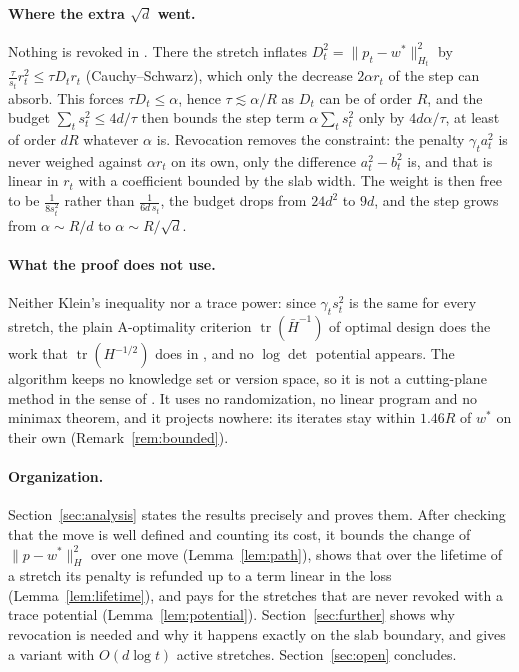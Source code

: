 \documentclass[11pt]{article}
\theoremstyle{plain}
\theoremstyle{definition}
\theoremstyle{remark}
\DeclareMathOperator{\tr}{tr}
\newcommand{\wstar}{w^{\ast}}
\begin{document}
\paragraph{Where the extra $\sqrt d$ went.} Nothing is revoked in \cite{Cai26}. There the stretch
inflates $D_t^{2}=\|p_t-\wstar\|_{H_t}^{2}$ by $\tfrac{\tau}{s_t}r_t^{2}\le\tau D_tr_t$
(Cauchy--Schwarz), which only the decrease $2\alpha r_t$ of the step can absorb. This forces
$\tau D_t\le\alpha$, hence $\tau\lesssim\alpha/R$ as $D_t$ can be of order $R$, and the budget
$\sum_ts_t^{2}\le4d/\tau$ then bounds the step term $\alpha\sum_ts_t^{2}$ only by $4d\alpha/\tau$,
at least of order $dR$ whatever $\alpha$ is. Revocation removes the constraint: the penalty
$\gamma_ta_t^{2}$ is never weighed against $\alpha r_t$ on its own, only the difference
$a_t^{2}-b_t^{2}$ is, and that is linear in $r_t$ with a coefficient bounded by the slab width. The
weight is then free to be $\tfrac{1}{8s_t^{2}}$ rather than $\tfrac{1}{6d\,s_t}$, the budget drops
from $24d^{2}$ to $9d$, and the step grows from $\alpha\sim R/d$ to $\alpha\sim R/\sqrt d$.

\paragraph{What the proof does not use.} Neither Klein's inequality nor a trace power: since
$\gamma_ts_t^{2}$ is the same for every stretch, the plain A-optimality criterion
$\tr(\bar H^{-1})$ of optimal design \cite{Kiefer74} does the work that $\tr(H^{-1/2})$ does in
\cite{Cai26}, and no $\log\det$ potential appears. The algorithm keeps no knowledge set or version
space, so it is not a cutting-plane method in the sense of \cite{NY,Vaidya,LSW}. It uses no
randomization, no linear program and no minimax theorem, and it projects nowhere: its iterates stay
within $1.46R$ of $\wstar$ on their own (Remark~\ref{rem:bounded}).
\fi

\paragraph{Organization.} Section~\ref{sec:analysis} states the results precisely and proves them.
After checking that the move is well defined and counting its cost, it bounds the change of
$\|p-\wstar\|_{H}^{2}$ over one move (Lemma~\ref{lem:path}), shows that over the lifetime of a stretch
its penalty is refunded up to a term linear in the loss (Lemma~\ref{lem:lifetime}), and pays for the
stretches that are never revoked with a trace potential (Lemma~\ref{lem:potential}).
Section~\ref{sec:further} shows why revocation is needed and why it happens exactly on the slab
boundary, and gives a variant with $O(d\log t)$ active stretches. Section~\ref{sec:open} concludes.
\end{document}
